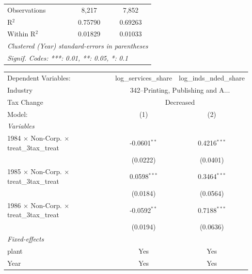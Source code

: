 \documentclass[
  12pt]{article}
\theoremstyle{definition}
\theoremstyle{remark}
\begin{document}
\begin{table}
\begin{minipage}{\linewidth}
\begin{tabular}{lcc}
   Observations                                            & 8,217                  & 7,852\\  
   R$^2$                                                   & 0.75790                & 0.69263\\  
   Within R$^2$                                            & 0.01829                & 0.01033\\  
   \midrule \midrule
   \multicolumn{3}{l}{\emph{Clustered (Year) standard-errors in parentheses}}\\
   \multicolumn{3}{l}{\emph{Signif. Codes: ***: 0.01, **: 0.05, *: 0.1}}\\
\end{tabular}
\par\endgroup
\begingroup
\centering
\begin{tabular}{lcc}
   \tabularnewline \midrule \midrule
   Dependent Variables:                                    & log\_services\_share   & log\_inds\_nded\_share\\     
   Industry & \multicolumn{2}{c}{342–Printing, Publishing and A...} \\ 
   Tax Change & \multicolumn{2}{c}{Decreased} \\ 
   Model:                                                  & (1)                    & (2)\\  
   \midrule
   \emph{Variables}\\
   1984 $\times$ Non-Corp. $\times$ treat\_3tax\_treat     & -0.0601$^{**}$         & 0.4216$^{***}$\\   
                                                           & (0.0222)               & (0.0401)\\   
   1985 $\times$ Non-Corp. $\times$ treat\_3tax\_treat     & 0.0598$^{***}$         & 0.3464$^{***}$\\   
                                                           & (0.0184)               & (0.0564)\\   
   1986 $\times$ Non-Corp. $\times$ treat\_3tax\_treat     & -0.0592$^{**}$         & 0.7188$^{***}$\\   
                                                           & (0.0194)               & (0.0636)\\   
   \midrule
   \emph{Fixed-effects}\\
   plant                                                   & Yes                    & Yes\\  
   Year                                                    & Yes                    & Yes\\  

\end{tabular}
\end{minipage}
\end{table}
\end{document}
